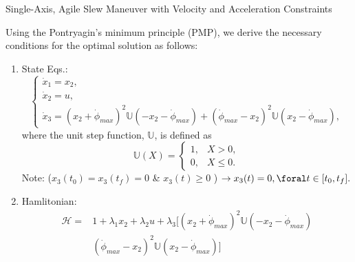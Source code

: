 \documentclass{beamer}
\newcounter{saveenumi}
\newcommand{\seti}{\setcounter{saveenumi}{\value{enumi}}}
\begin{document}
\begin{frame}
\begin{block}{ Single-Axis, Agile Slew Maneuver with Velocity and Acceleration Constraints}
\small{
Using the Pontryagin's minimum principle (PMP), we derive the necessary conditions for the optimal solution as follows:
\begin{enumerate}
\item State Eqs.:
\begin{equation}
\left\{
                \begin{array}{l}
                \dot{x}_1=x_2, \\
                \dot{x}_2=u, \\
                \dot{x}_3=(x_2+\dot{\phi}_{max})^2\mathbb{U}(-x_2-\dot{\phi}_{max})+(\dot{\phi}_{max}-x_2)^2\mathbb{U}(x_2-\dot{\phi}_{max}),
                \end{array}
              \right.
\end{equation}
where the unit step function, $\mathbb{U}$, is defined as
\begin{equation}
\mathbb{U}(X)=\left\{
                \begin{array}{lI}
           1,&X> 0,\\
           0,& X\leq 0.
                \end{array}
              \right.
 \end{equation}
Note:  ($x_3(t_0)=x_3(t_f)=0$ \& $x_3(t)\geq 0$ ) $\rightarrow x_3(t)=0, \foral t\in[t_0, t_f]. $  
\item Hamlitonian:
\begin{equation}
\begin{split}
\mathscr{H}=& 1+\lambda_1x_2+\lambda_2 u+\lambda_3\Big[(x_2+\dot{\phi}_{max})^2\mathbb{U}(-x_2-\dot{\phi}_{max})\\
& (\dot{\phi}_{max}-x_2)^2\mathbb{U}(x_2-\dot{\phi}_{max})\Big]
\end{split}
\end{equation}
\end{enumerate}
}
\seti
\end{block}
\end{frame}
\end{document}
